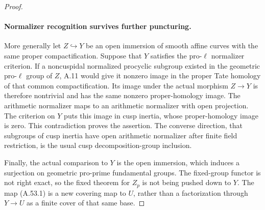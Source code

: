 \begin{proof}
\paragraph{Normalizer recognition survives further puncturing.}
More generally let \(Z\hookrightarrow Y\) be an open immersion of
smooth affine curves with the same proper compactification. Suppose
that \(Y\) satisfies the pro-\(\ell\) normalizer criterion. If a
noncuspidal normalized procyclic subgroup existed in the geometric
pro-\(\ell\) group of \(Z\), A.11 would give it nonzero image in
the proper Tate homology of that common compactification. Its image
under the actual morphism \(Z\to Y\) is therefore nontrivial and
has the same nonzero proper-homology image. The arithmetic normalizer
maps to an arithmetic normalizer with open projection. The criterion
on \(Y\) puts this image in cusp inertia, whose proper-homology
image is zero. This contradiction proves the assertion.
The converse direction, that subgroups of cusp inertia have open
arithmetic normalizer after finite field restriction, is the usual
cusp decomposition-group inclusion.

Finally, the actual comparison to \(Y\) is the open immersion, which
induces a surjection on geometric pro-prime fundamental groups.
The fixed-group functor is not right exact, so the fixed theorem
for \(Z_p\) is not being pushed down to \(Y\). The map (A.53.1)
is a new covering map to \(U\), rather than a factorization through
\(Y\to U\) as a finite cover of that same base.
\end{proof}
